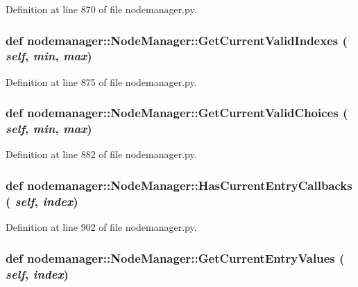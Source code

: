 Definition at line 870 of file nodemanager.py.\hypertarget{classnodemanager_1_1NodeManager_d94d7b584774b19dc7837c5a13ad4432}{
\subsubsection[GetCurrentValidIndexes]{\setlength{\rightskip}{0pt plus 5cm}def nodemanager::Node\-Manager::Get\-Current\-Valid\-Indexes ( {\em self},  {\em min},  {\em max})}}
\label{classnodemanager_1_1NodeManager_d94d7b584774b19dc7837c5a13ad4432}




Definition at line 875 of file nodemanager.py.\hypertarget{classnodemanager_1_1NodeManager_0c3c317016818a79581f63b14d16c2da}{
\subsubsection[GetCurrentValidChoices]{\setlength{\rightskip}{0pt plus 5cm}def nodemanager::Node\-Manager::Get\-Current\-Valid\-Choices ( {\em self},  {\em min},  {\em max})}}
\label{classnodemanager_1_1NodeManager_0c3c317016818a79581f63b14d16c2da}




Definition at line 882 of file nodemanager.py.\hypertarget{classnodemanager_1_1NodeManager_e1be8def7949033e446a646dc67647c6}{
\subsubsection[HasCurrentEntryCallbacks]{\setlength{\rightskip}{0pt plus 5cm}def nodemanager::Node\-Manager::Has\-Current\-Entry\-Callbacks ( {\em self},  {\em index})}}
\label{classnodemanager_1_1NodeManager_e1be8def7949033e446a646dc67647c6}




Definition at line 902 of file nodemanager.py.\hypertarget{classnodemanager_1_1NodeManager_ea668e18d26d0b47fbbed4f6eb920100}{
\subsubsection[GetCurrentEntryValues]{\setlength{\rightskip}{0pt plus 5cm}def nodemanager::Node\-Manager::Get\-Current\-Entry\-Values ( {\em self},  {\em index})}}
\label{classnodemanager_1_1NodeManager_ea668e18d26d0b47fbbed4f6eb920100}




